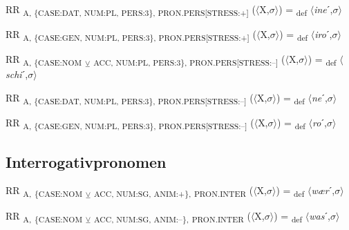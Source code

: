 {\begin{exe}
 RR \textsubscript{A, \{CASE:DAT, NUM:PL, PERS:3\}, PRON.PERS[STRESS:+]} ($\langle$X,$\sigma $$\rangle$) = \textsubscript{def} $\langle$\textit{ine}ˊ,$\sigma $$\rangle$
\end{exe}

\begin{exe}
 RR \textsubscript{A, \{CASE:GEN, NUM:PL, PERS:3\}, PRON.PERS[STRESS:+]} ($\langle$X,$\sigma $$\rangle$) = \textsubscript{def} $\langle$\textit{iro}ˊ,$\sigma $$\rangle$
\end{exe}

\begin{exe}
 RR \textsubscript{A, \{CASE:NOM} \textsubscript{${\veebar}$}\textsubscript{ ACC, NUM:PL, PERS:3\}, PRON.PERS[STRESS:–]} ($\langle$X,$\sigma $$\rangle$) = \textsubscript{def} $\langle$\textit{schi}ˊ,$\sigma $$\rangle$
\end{exe}

\begin{exe}
 RR \textsubscript{A, \{CASE:DAT, NUM:PL, PERS:3\}, PRON.PERS[STRESS:–]} ($\langle$X,$\sigma $$\rangle$) = \textsubscript{def} $\langle$\textit{ne}ˊ,$\sigma $$\rangle$
\end{exe}

\begin{exe}
 RR \textsubscript{A, \{CASE:GEN, NUM:PL, PERS:3\}, PRON.PERS[STRESS:–]} ($\langle$X,$\sigma $$\rangle$) = \textsubscript{def} $\langle$\textit{ro}ˊ,$\sigma $$\rangle$
\end{exe}

\subsection{Interrogativpronomen}

\begin{exe}
 RR \textsubscript{A,} \textsubscript{\{CASE:NOM} \textsubscript{${\veebar}$}\textsubscript{ ACC, NUM:SG, ANIM:+\},} \textsubscript{PRON.INTER} ($\langle$X,$\sigma $$\rangle$) = \textsubscript{def} $\langle$\textit{wær}ˊ,$\sigma $$\rangle$
\end{exe}

\begin{exe}
 RR \textsubscript{A,} \textsubscript{\{CASE:NOM} \textsubscript{${\veebar}$}\textsubscript{ ACC, NUM:SG, ANIM:–\},} \textsubscript{PRON.INTER} ($\langle$X,$\sigma $$\rangle$) = \textsubscript{def} $\langle$\textit{was}ˊ,$\sigma $$\rangle$
\end{exe}

}
